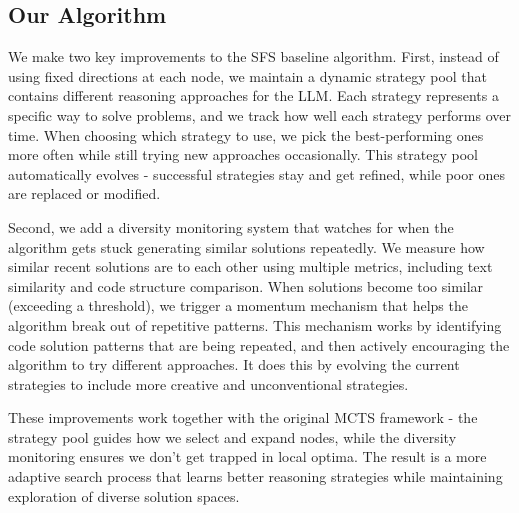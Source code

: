 \documentclass{article} %
\theoremstyle{definition}
\theoremstyle{remark}
\begin{document}
\subsection{Our Algorithm}

We make two key improvements to the SFS baseline algorithm. First, instead of using fixed directions at each node, we maintain a dynamic strategy pool that contains different reasoning approaches for the LLM. Each strategy represents a specific way to solve problems, and we track how well each strategy performs over time. When choosing which strategy to use, we pick the best-performing ones more often while still trying new approaches occasionally. This strategy pool automatically evolves - successful strategies stay and get refined, while poor ones are replaced or modified.

Second, we add a diversity monitoring system that watches for when the algorithm gets stuck generating similar solutions repeatedly. We measure how similar recent solutions are to each other using multiple metrics, including text similarity and code structure comparison. When solutions become too similar (exceeding a threshold), we trigger a momentum mechanism that helps the algorithm break out of repetitive patterns. This mechanism works by identifying code solution patterns that are being repeated, and then actively encouraging the algorithm to try different approaches. It does this by evolving the current strategies to include more creative and unconventional strategies.

These improvements work together with the original MCTS framework - the strategy pool guides how we select and expand nodes, while the diversity monitoring ensures we don't get trapped in local optima. The result is a more adaptive search process that learns better reasoning strategies while maintaining exploration of diverse solution spaces.
\end{document}
